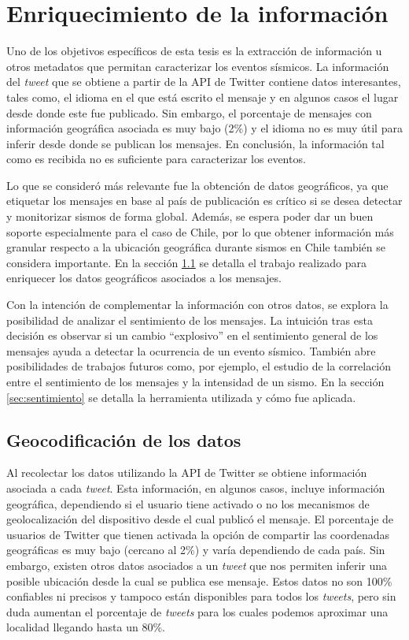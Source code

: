 \chapter{Enriquecimiento de la información}
\label{cap:procesamiento}

Uno de los objetivos específicos de esta tesis es la extracción de información u otros metadatos que permitan caracterizar los eventos sísmicos. 
%
La información del \textit{tweet} que se obtiene a partir de la API de Twitter contiene datos interesantes, tales como, el idioma en el que está escrito el mensaje y en algunos casos el lugar desde donde este fue publicado. Sin embargo, el porcentaje de mensajes con información geográfica asociada es muy bajo (2\%) y el idioma no es muy útil para inferir desde donde se publican los mensajes.
%
En conclusión, la información tal como es recibida no es suficiente para caracterizar los eventos. 

Lo que se consideró más relevante fue la obtención de datos geográficos, ya que etiquetar los mensajes en base al país de publicación es crítico si se desea detectar y monitorizar sismos de forma global.
Además, se espera poder dar un buen soporte especialmente para el caso de Chile, por lo que obtener información más granular respecto a la ubicación geográfica durante sismos en Chile también se considera importante. En la sección \ref{sec:geocodificacion} se detalla el trabajo realizado para enriquecer los datos geográficos asociados a los mensajes.

Con la intención de complementar la información con otros datos, se explora la posibilidad de analizar el sentimiento de los mensajes. La intuición tras esta decisión es observar si un cambio ``explosivo'' en el sentimiento general de los mensajes ayuda a detectar la ocurrencia de un evento sísmico. También abre posibilidades de trabajos futuros como, por ejemplo, el estudio de la correlación entre el sentimiento de los mensajes y la intensidad de un sismo. En la sección \ref{sec:sentimiento} se detalla la herramienta utilizada y cómo fue aplicada.

\section{Geocodificación de los datos}
\label{sec:geocodificacion}

Al recolectar los datos utilizando la API de Twitter se obtiene información asociada a cada \textit{tweet}. 
%
Esta información, en algunos casos, incluye información geográfica, dependiendo si el usuario tiene activado o no los mecanismos de geolocalización del dispositivo desde el cual publicó el mensaje.
%
El porcentaje de usuarios de Twitter que tienen activada la opción de compartir las coordenadas geográficas es muy bajo (cercano al 2\%) y varía dependiendo de cada país. 
%
Sin embargo, existen otros datos asociados a un \textit{tweet} que nos permiten inferir una posible ubicación desde la cual se publica ese mensaje. 
%
Estos datos no son 100\% confiables ni precisos y tampoco están disponibles para todos los \textit{tweets}, pero sin duda aumentan el porcentaje de \textit{tweets} para los cuales podemos aproximar una localidad llegando hasta un 80\%.


